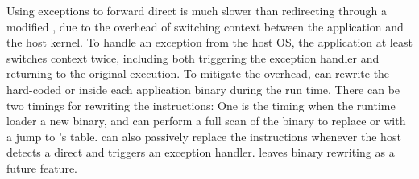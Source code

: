 Using exceptions to forward direct \linuxapi{} is much slower than redirecting through a modified \libc{},
due to the overhead of switching context between the application and the host kernel.
To handle an exception from the host OS,
the application at least switches context twice, including both triggering the exception handler and returning to the original execution.
To mitigate the overhead,
\thelibos{} can 
rewrite the hard-coded  or  inside each application binary during the run time.
There can be two timings for rewriting the instructions:
One is the timing when the runtime loader a new binary, and \thelibos{} can perform a full scan of the binary
to replace  or  with a jump to \thelibos{}'s \linuxapi{} table.
\thelibos{} can also passively replace the instructions
whenever the host detects a direct \linuxapi{} and triggers an exception handler.
\graphene{} leaves binary rewriting
as a future feature.


